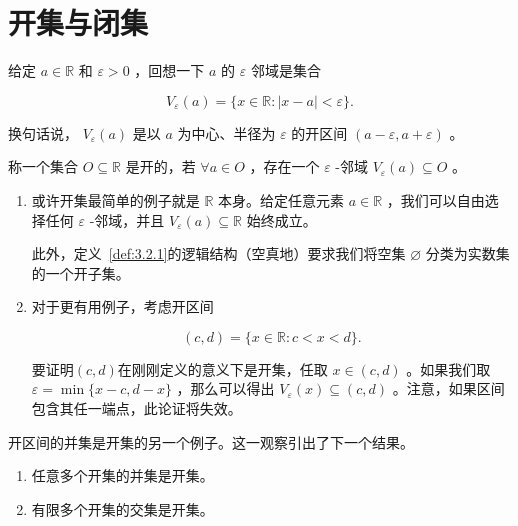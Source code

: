 \section{开集与闭集}
\label{sec:3.2}

给定 \(a \in  \mathbb{R}\) 和 \(\varepsilon  > 0\) ，回想一下 \(a\) 的 \(\varepsilon\) 邻域是集合

\[
{V}_{\varepsilon }\left( a\right)  = \{ x \in  \mathbb{R} : \left| {x - a}\right|  < \varepsilon \} .
\]

换句话说， \({V}_{\varepsilon }\left( a\right)\) 是以 \(a\) 为中心、半径为 \(\varepsilon\) 的开区间 \(\left( {a - \varepsilon ,a + \varepsilon }\right)\) 。

\begin{Def}
  \label{def:3.2.1}
  称一个集合 \(O \subseteq  \mathbb{R}\) 是开的，若 \(\forall a \in  O\) ，存在一个 \(\varepsilon\) -邻域 \({V}_{\varepsilon }\left( a\right)  \subseteq  O\) 。
\end{Def}


\begin{Eg}
  \label{eg:3.2.2}
  \begin{enumerate}[label = (\roman*)]
  \item\label{item:3.2.1}或许开集最简单的例子就是 \(\mathbb{R}\) 本身。给定任意元素 \(a \in  \mathbb{R}\) ，我们可以自由选择任何 \(\varepsilon\) -邻域，并且 \({V}_{\varepsilon }\left( a\right)  \subseteq  \mathbb{R}\) 始终成立。

    此外，定义~\ref{def:3.2.1}的逻辑结构（空真地）要求我们将空集 \(\varnothing\) 分类为实数集的一个开子集。
  \item \label{item:3.2.2} 对于更有用例子，考虑开区间

\[
\left( {c,d}\right)  = \{ x \in  \mathbb{R} : c < x < d\} .
\]

要证明$(c, d)$在刚刚定义的意义下是开集，任取 \(x \in  \left( {c,d}\right)\) 。如果我们取 \(\varepsilon  = \min \{ x - c,d - x\}\) ，那么可以得出 \({V}_{\varepsilon }\left( x\right)  \subseteq  \left( {c,d}\right)\) 。注意，如果区间包含其任一端点，此论证将失效。
  \end{enumerate}
\end{Eg}

开区间的并集是开集的另一个例子。这一观察引出了下一个结果。


\begin{Thm}
  \label{thm:3.2.3}
  
  \begin{enumerate}[label = (\roman*)]
  \item\label{item:3.2.3} 任意多个开集的并集是开集。
  \item \label{item:3.2.4}有限多个开集的交集是开集。
  \end{enumerate}
\end{Thm}

